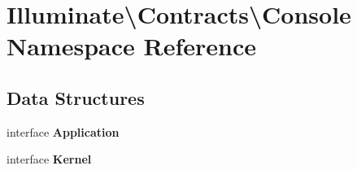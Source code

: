 \section{Illuminate\textbackslash{}Contracts\textbackslash{}Console Namespace Reference}
\label{namespace_illuminate_1_1_contracts_1_1_console}
\subsection*{Data Structures}
\begin{DoxyCompactItemize}
\item 
interface {\bf Application}
\item 
interface {\bf Kernel}
\end{DoxyCompactItemize}
